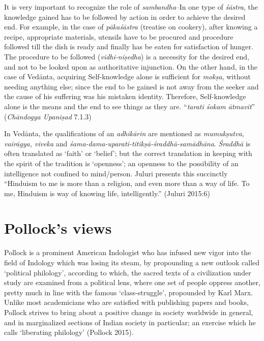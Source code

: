 It is very important to recognize the role of {\sl sambandha}--In one type of {\sl śāstra}, the knowledge gained has to be followed by action in order to achieve the desired end. For example, in the case of {\sl pākaśāstra} (treatise on cookery), after knowing a recipe, appropriate materials, utensils have to be procured and procedure followed till the dish is ready and ﬁnally has be eaten for satisfaction of hunger. The procedure to be followed ({\sl vidhi-niṣedha}) is a necessity for the desired end, and not to be looked upon as authoritative injunction. On the other hand, in the case of Vedānta, acquiring Self-knowledge alone is suﬃcient for {\sl mokṣa}, without needing anything else; since the end to be gained is not away from the seeker and the cause of his suffering was his mistaken identity. Therefore, Self-knowledge alone is the means and the end to see things as they are.  ``{\sl tarati śokam ātmavit}'' ({\sl Chāndogya Upaniṣad} 7.1.3)

In Vedānta, the qualiﬁcations of an {\sl adhikārin} are mentioned as {\sl mumukṣutva, vairāgya, viveka} and {\sl śama-dama-uparati-titikṣā-śraddhā-samādhāna}. {\sl Śraddhā} is often translated as `faith' or `belief'; but the correct translation in keeping with the spirit of the tradition is `openness'; an openness to the possibility of an intelligence not conﬁned to mind/person. Juluri presents this succinctly ``Hinduism to me is more than a religion, and even more than a way of life. To me, Hinduism is way of knowing life, intelligently.'' (Juluri 2015:6)

\section{Pollock's views}\label{art12-sec3}

Pollock is a prominent American Indologist who has infused new vigor into the ﬁeld of Indology which was losing its steam, by propounding a new outlook called `political philology', according to which, the sacred texts of a civilization under study are examined from a political lens, where one set of people oppress another, pretty much in line with the famous `class-struggle', propounded by Karl Marx. Unlike most academicians who are satisﬁed with publishing papers and books, Pollock strives to bring about a positive change in society worldwide in general, and in marginalized sections of Indian society in particular; an exercise which he calls `liberating philology' (Pollock 2015).

